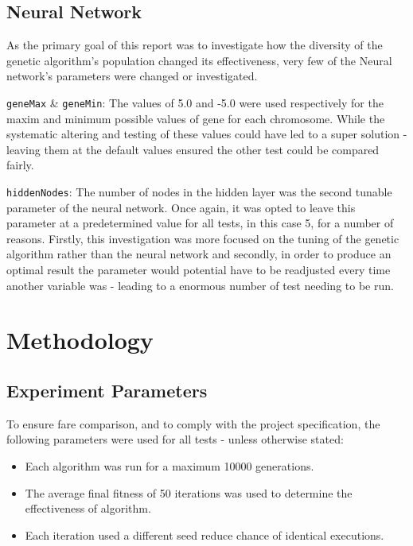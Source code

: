 	\subsection{Neural Network}
		As the primary goal of this report was to investigate how the diversity of the genetic algorithm's population changed its effectiveness, very few of the Neural network's parameters were changed or investigated.
		
		\texttt{geneMax} \& \texttt{geneMin}: The values of 5.0 and -5.0 were used respectively for the maxim and minimum possible values of gene for each chromosome. While the systematic altering and testing of these values could have led to a super solution - leaving them at the default values ensured the other test could be compared fairly.
		
		\texttt{hiddenNodes}: The number of nodes in the hidden layer was the second tunable parameter of the neural network. Once again, it was opted to leave this parameter at a predetermined value for all tests, in this case 5, for a number of reasons. Firstly, this investigation was more focused on the tuning of the genetic algorithm rather than the neural network and secondly, in order to produce an optimal result the parameter would potential have to be readjusted every time another variable was - leading to a enormous number of test needing to be run.
		
		
\section{Methodology}
	\subsection{Experiment Parameters}
		To ensure fare comparison, and to comply with the project specification, the following parameters were used for all tests - unless otherwise stated:
		\begin{itemize}
			\item Each algorithm was run for a maximum 10000 generations.
			\item The average final fitness of 50 iterations was used to determine the effectiveness of algorithm.
			\item Each iteration used a different seed reduce chance of identical executions.
		\end{itemize}
	
